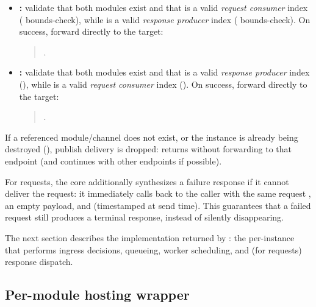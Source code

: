 \begin{itemize}
    \item \textbf{:}
    validate that both modules exist and that  is a valid \emph{request consumer} index ( bounds-check),
    while  is a valid \emph{response producer} index ( bounds-check).
    On success, forward directly to the target:
    \begin{quote}
      .
    \end{quote}

    \item \textbf{:}
    validate that both modules exist and that  is a valid \emph{response producer} index (),
    while  is a valid \emph{request consumer} index ().
    On success, forward directly to the target:
    \begin{quote}
      .
    \end{quote}
\end{itemize}

If a referenced module/channel does not exist, or the instance is already being destroyed (), publish delivery is dropped:
 returns without forwarding to that endpoint (and continues with other endpoints if possible).

For requests, the core additionally synthesizes a failure response if it cannot deliver the request:
it immediately calls  back to the caller with the same request , an empty payload, and  (timestamped at send time).
This guarantees that a failed request still produces a terminal response, instead of silently disappearing.

The next section describes the  implementation returned by : the per-instance  that performs ingress decisions, queueing, worker scheduling, and (for requests) response dispatch.




\subsection{Per-module hosting wrapper} \label{subsec:ch3_core_per_module_wrapper}

